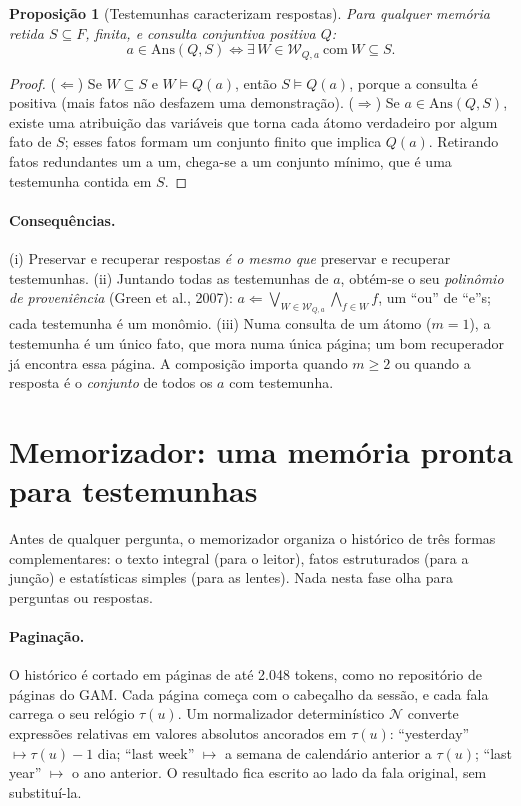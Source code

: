 \documentclass[11pt]{article}
\newtheorem{proposicao}{Proposição}
\begin{document}
\begin{proposicao}[Testemunhas caracterizam respostas]\label{prop:caracterizacao}
Para qualquer memória retida $S\subseteq F$, finita, e consulta conjuntiva
positiva $Q$:
\[
a\in\mathrm{Ans}(Q,S)\iff \exists\,W\in\mathcal{W}_{Q,a}\ \text{com}\ W\subseteq S.
\]
\end{proposicao}
\begin{proof}
($\Leftarrow$) Se $W\subseteq S$ e $W\models Q(a)$, então $S\models Q(a)$,
porque a consulta é positiva (mais fatos não desfazem uma demonstração).
($\Rightarrow$) Se $a\in\mathrm{Ans}(Q,S)$, existe uma atribuição das
variáveis que torna cada átomo verdadeiro por algum fato de $S$; esses fatos
formam um conjunto finito que implica $Q(a)$. Retirando fatos redundantes um
a um, chega-se a um conjunto mínimo, que é uma testemunha contida em $S$.
\end{proof}

\paragraph{Consequências.}
(i) Preservar e recuperar respostas \emph{é o mesmo que} preservar e
recuperar testemunhas. (ii) Juntando todas as testemunhas de $a$, obtém-se o
seu \emph{polinômio de proveniência} (Green et al., 2007):
$a\Leftarrow\bigvee_{W\in\mathcal{W}_{Q,a}}\bigwedge_{f\in W}f$, um ``ou'' de
``e''s; cada testemunha é um monômio. (iii) Numa consulta de um átomo
($m=1$), a testemunha é um único fato, que mora numa única página; um bom
recuperador já encontra essa página. A composição importa quando $m\ge2$ ou
quando a resposta é o \emph{conjunto} de todos os $a$ com testemunha.

\section{Memorizador: uma memória pronta para testemunhas}\label{sec:memorizador}

\begin{intuicao}
Antes de qualquer pergunta, o memorizador organiza o histórico de três
formas complementares: o texto integral (para o leitor), fatos estruturados
(para a junção) e estatísticas simples (para as lentes). Nada nesta fase olha
para perguntas ou respostas.
\end{intuicao}

\paragraph{Paginação.}
O histórico é cortado em páginas de até 2.048 tokens, como no repositório de
páginas do GAM. Cada página começa com o cabeçalho da sessão, e cada fala
carrega o seu relógio $\tau(u)$. Um normalizador determinístico $\mathcal{N}$
converte expressões relativas em valores absolutos ancorados em $\tau(u)$:
``yesterday'' $\mapsto\tau(u)-1$ dia; ``last week'' $\mapsto$ a semana de
calendário anterior a $\tau(u)$; ``last year'' $\mapsto$ o ano anterior. O
resultado fica escrito ao lado da fala original, sem substituí-la.
\end{document}
